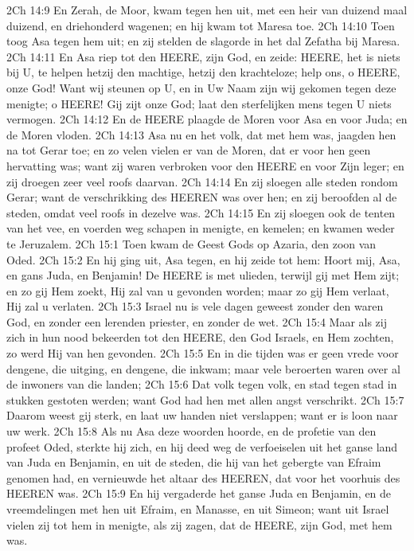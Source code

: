 2Ch 14:9  En Zerah, de Moor, kwam tegen hen uit, met een heir van duizend maal duizend, en driehonderd wagenen; en hij kwam tot Maresa toe.
2Ch 14:10  Toen toog Asa tegen hem uit; en zij stelden de slagorde in het dal Zefatha bij Maresa.
2Ch 14:11  En Asa riep tot den HEERE, zijn God, en zeide: HEERE, het is niets bij U, te helpen hetzij den machtige, hetzij den krachteloze; help ons, o HEERE, onze God! Want wij steunen op U, en in Uw Naam zijn wij gekomen tegen deze menigte; o HEERE! Gij zijt onze God; laat den sterfelijken mens tegen U niets vermogen.
2Ch 14:12  En de HEERE plaagde de Moren voor Asa en voor Juda; en de Moren vloden.
2Ch 14:13  Asa nu en het volk, dat met hem was, jaagden hen na tot Gerar toe; en zo velen vielen er van de Moren, dat er voor hen geen hervatting was; want zij waren verbroken voor den HEERE en voor Zijn leger; en zij droegen zeer veel roofs daarvan.
2Ch 14:14  En zij sloegen alle steden rondom Gerar; want de verschrikking des HEEREN was over hen; en zij beroofden al de steden, omdat veel roofs in dezelve was.
2Ch 14:15  En zij sloegen ook de tenten van het vee, en voerden weg schapen in menigte, en kemelen; en kwamen weder te Jeruzalem.
2Ch 15:1  Toen kwam de Geest Gods op Azaria, den zoon van Oded.
2Ch 15:2  En hij ging uit, Asa tegen, en hij zeide tot hem: Hoort mij, Asa, en gans Juda, en Benjamin! De HEERE is met ulieden, terwijl gij met Hem zijt; en zo gij Hem zoekt, Hij zal van u gevonden worden; maar zo gij Hem verlaat, Hij zal u verlaten.
2Ch 15:3  Israel nu is vele dagen geweest zonder den waren God, en zonder een lerenden priester, en zonder de wet.
2Ch 15:4  Maar als zij zich in hun nood bekeerden tot den HEERE, den God Israels, en Hem zochten, zo werd Hij van hen gevonden.
2Ch 15:5  En in die tijden was er geen vrede voor dengene, die uitging, en dengene, die inkwam; maar vele beroerten waren over al de inwoners van die landen;
2Ch 15:6  Dat volk tegen volk, en stad tegen stad in stukken gestoten werden; want God had hen met allen angst verschrikt.
2Ch 15:7  Daarom weest gij sterk, en laat uw handen niet verslappen; want er is loon naar uw werk.
2Ch 15:8  Als nu Asa deze woorden hoorde, en de profetie van den profeet Oded, sterkte hij zich, en hij deed weg de verfoeiselen uit het ganse land van Juda en Benjamin, en uit de steden, die hij van het gebergte van Efraim genomen had, en vernieuwde het altaar des HEEREN, dat voor het voorhuis des HEEREN was.
2Ch 15:9  En hij vergaderde het ganse Juda en Benjamin, en de vreemdelingen met hen uit Efraim, en Manasse, en uit Simeon; want uit Israel vielen zij tot hem in menigte, als zij zagen, dat de HEERE, zijn God, met hem was.
